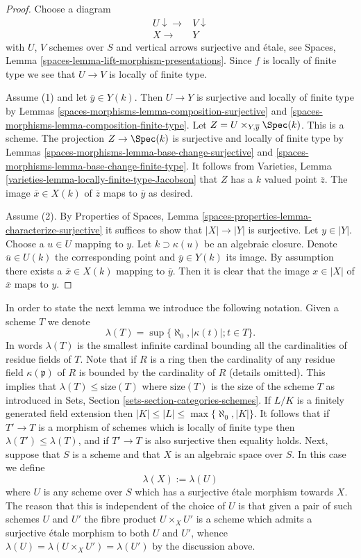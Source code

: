 \begin{proof}
Choose a diagram
$$
\begin{array}{cc}U \downarrow\longrightarrow & V \downarrow \\ X \longrightarrow & Y\end{array}
$$
with $U$, $V$ schemes over $S$ and vertical arrows surjective
and \'etale, see
Spaces, Lemma \ref{spaces-lemma-lift-morphism-presentations}.
Since $f$ is locally of finite type we see that $U \to V$ is locally of
finite type.

\medskip\noindent
Assume (1) and let $\overline{y} \in Y(k)$. Then $U \to Y$ is
surjective and locally of finite type by
Lemmas \ref{spaces-morphisms-lemma-composition-surjective} and
\ref{spaces-morphisms-lemma-composition-finite-type}.
Let $Z = U \times_{Y, \overline{y}} \Spec(k)$. This is a scheme.
The projection $Z \to \Spec(k)$
is surjective and locally of finite type by
Lemmas \ref{spaces-morphisms-lemma-base-change-surjective} and
\ref{spaces-morphisms-lemma-base-change-finite-type}.
It follows from
Varieties, Lemma \ref{varieties-lemma-locally-finite-type-Jacobson}
that $Z$ has a $k$ valued point $\overline{z}$. The image
$\overline{x} \in X(k)$ of $\overline{z}$ maps to $\overline{y}$
as desired.

\medskip\noindent
Assume (2). By
Properties of Spaces,
Lemma \ref{spaces-properties-lemma-characterize-surjective}
it suffices to show that $|X| \to |Y|$ is surjective.
Let $y \in |Y|$. Choose a $u \in U$ mapping to $y$.
Let $k \supset \kappa(u)$ be an algebraic closure. Denote
$\overline{u} \in U(k)$ the corresponding point and
$\overline{y} \in Y(k)$ its image. By assumption there exists
a $\overline{x} \in X(k)$ mapping to $\overline{y}$.
Then it is clear that the image $x \in |X|$ of $\overline{x}$
maps to $y$.
\end{proof}

In order to state the next lemma we introduce the following
notation. Given a scheme $T$ we denote
$$
\lambda(T) = \sup\{\aleph_0, |\kappa(t)| ; t \in T\}.
$$
In words $\lambda(T)$ is the smallest infinite cardinal bounding
all the cardinalities of residue fields of $T$. Note that if $R$
is a ring then the cardinality of any residue field $\kappa(\mathfrak p)$
of $R$ is bounded by the cardinality of $R$ (details omitted).
This implies that $\lambda(T) \leq \text{size}(T)$ where
$\text{size}(T)$ is the size of the scheme $T$ as introduced in
Sets, Section \ref{sets-section-categories-schemes}.
If $L/K$ is a finitely generated field extension then
$|K| \leq |L| \leq \max\{\aleph_0, |K|\}$. It follows that if $T' \to T$
is a morphism of schemes which is locally of finite
type then $\lambda(T') \leq \lambda(T)$, and if $T' \to T$ is also
surjective then equality holds. Next, suppose that $S$ is a scheme
and that $X$ is an algebraic space over $S$. In this case we define
$$
\lambda(X) := \lambda(U)
$$
where $U$ is any scheme over $S$ which has a surjective \'etale morphism
towards $X$. The reason that this is independent of the choice of $U$
is that given a pair of such schemes $U$ and $U'$ the fibre product
$U \times_X U'$ is a scheme which admits a surjective \'etale morphism
to both $U$ and $U'$, whence $\lambda(U) = \lambda(U \times_X U') =
\lambda(U')$ by the discussion above.

